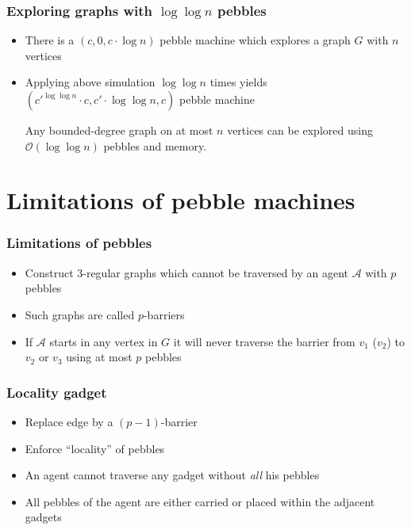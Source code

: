 \documentclass{beamer}
\begin{document}
\begin{frame}
  \frametitle{Exploring graphs with $\log\log n$ pebbles}
  \begin{itemize}
    \item There is a $(c,0,c\cdot\log n)$ pebble machine which explores
      a graph $G$ with $n$ vertices
    \item Applying above simulation $\log \log n$ times yields
      $(c'^{\log\log n}\cdot c, c'\cdot\log\log n, c)$ pebble machine
      \begin{theorem}
        Any bounded-degree graph on at most $n$ vertices can be explored using
        $\mathcal{O}(\log\log n)$ pebbles and memory.
      \end{theorem}
  \end{itemize}
\end{frame}

\section{Limitations of pebble machines}
\begin{frame}
  \frametitle{Limitations of pebbles}
  \begin{itemize}
    \item Construct 3-regular graphs which cannot be traversed by an agent
      $\mathcal{A}$ with $p$ pebbles
    \item Such graphs are called $p$-barriers
      \begin{center}
        \resizebox{0.7\textwidth}{!}{}
      \end{center}
    \item If $\mathcal{A}$ starts in any vertex in $G$ it will never traverse
      the barrier from $v_{1}$ ($v_{2}$) to $v_{2}$ or $v_{3}$ using at most
      $p$ pebbles
  \end{itemize}
\end{frame}

\begin{frame}
  \frametitle{Locality gadget}
  \begin{itemize}
    \item Replace edge by a $(p-1)$-barrier
    \item Enforce \enquote{locality} of pebbles
    \item An agent cannot traverse any gadget without \emph{all} his pebbles
    \item All pebbles of the agent are either carried or placed within the
      adjacent gadgets
  \end{itemize}
  \begin{center}
  \end{center}
\end{frame}
\end{document}
